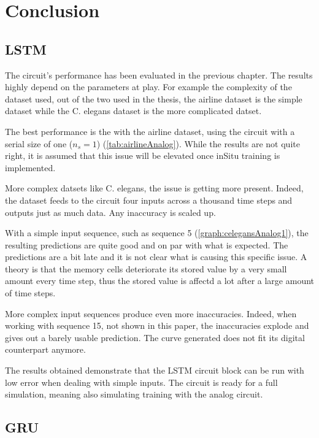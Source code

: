 \section{Conclusion}

\subsection{\ac{LSTM}}

The circuit's performance has been evaluated in the previous chapter. The results highly depend on the parameters at play. For example the complexity of the dataset used, out of the two used in the thesis, the airline dataset is the simple dataset while the \ac{C. elegans} dataset is the more complicated datset.

The best performance is the with the airline dataset, using the circuit with a serial size of one ($n_s=1$) (\cref{tab:airlineAnalog}). While the results are not quite right, it is assumed that this issue will be elevated once inSitu training is implemented.

More complex datsets like \ac{C. elegans}, the issue is getting more present. Indeed, the dataset feeds to the circuit four inputs across a thousand time steps and outputs just as much data. Any inaccuracy is scaled up.

With a simple input sequence, such as sequence 5 (\cref{graph:celegansAnalog1}), the resulting predictions are quite good and on par with what is expected. The predictions are a bit late and it is not clear what is causing this specific issue. A theory is that the memory cells deteriorate its stored value by a very small amount every time step, thus the stored value is affectd a lot after a large amount of time steps.

More complex input sequences produce even more inaccuracies. Indeed, when working with sequence 15, not shown in this paper, the inaccuracies explode and gives out a barely usable prediction. The curve generated does not fit its digital counterpart anymore.

The results obtained demonstrate that the \ac{LSTM} circuit block can be run with low error when dealing with simple inputs. The circuit is ready for a full simulation, meaning also simulating training with the analog circuit.

\subsection{\ac{GRU}}

